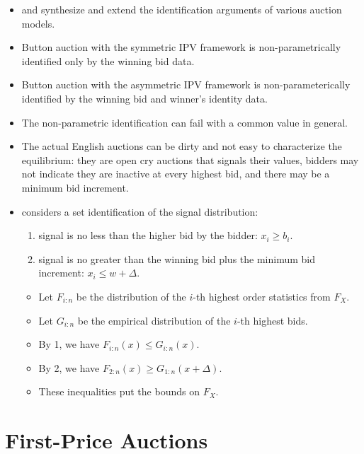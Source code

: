 \documentclass[
]{book}
\providecommand{\tightlist}{%
  \setlength{\itemsep}{0pt}\setlength{\parskip}{0pt}}
\begin{document}
\begin{itemize}
\tightlist
\item
  \citet{atheyIdentificationStandardAuction2002} and \citet{atheyChapter60Nonparametric2007} synthesize and extend the identification arguments of various auction models.
\item
  Button auction with the symmetric IPV framework is non-parametrically identified only by the winning bid data.
\item
  Button auction with the asymmetric IPV framework is non-parameterically identified by the winning bid and winner's identity data.
\item
  The non-parametric identification can fail with a common value in general.
\item
  The actual English auctions can be dirty and not easy to characterize the equilibrium: they are open cry auctions that signals their values, bidders may not indicate they are inactive at every highest bid, and there may be a minimum bid increment.
\item
  \citet{haileInferenceIncompleteModel2003} considers a set identification of the signal distribution:

  \begin{enumerate}
  \def\labelenumi{\arabic{enumi}.}
  \tightlist
  \item
    signal is no less than the higher bid by the bidder: \(x_i \ge b_i\).
  \item
    signal is no greater than the winning bid plus the minimum bid increment: \(x_i \le w + \Delta\).
  \end{enumerate}

  \begin{itemize}
  \tightlist
  \item
    Let \(F_{i:n}\) be the distribution of the \(i\)-th highest order statistics from \(F_X\).
  \item
    Let \(G_{i:n}\) be the empirical distribution of the \(i\)-th highest bids.
  \item
    By 1, we have \(F_{i:n}(x) \le G_{i:n}(x)\).
  \item
    By 2, we have \(F_{2:n}(x) \ge G_{1:n}(x + \Delta)\).
  \item
    These inequalities put the bounds on \(F_X\).
  \end{itemize}
\end{itemize}

\hypertarget{first-price-auctions}{%
\section{First-Price Auctions}\label{first-price-auctions}}
\end{document}
